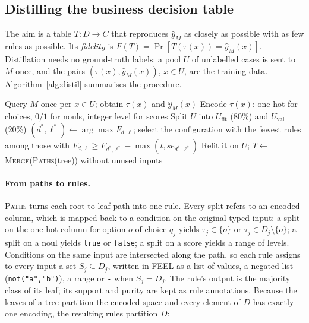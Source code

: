 \documentclass[a4paper,fleqn]{cas-sc}
\theoremstyle{definition}
\newcommand{\feel}[1]{\texttt{#1}}
\begin{document}
\subsection{Distilling the business decision table}\label{sec:distil}
The aim is a table $T: D\to C$ that reproduces $\hat y_M$ as closely as possible with as few rules as possible. Its \emph{fidelity} is $F(T)=\Pr[T(\tau(x))=\hat y_M(x)]$. Distillation needs no ground-truth labels: a pool $U$ of unlabelled cases is sent to $M$ once, and the pairs $(\tau(x),\hat y_M(x))$, $x\in U$, are the training data. Algorithm~\ref{alg:distil} summarises the procedure.

\begin{algorithm}[tbp]
  \caption{Distillation of a DMN decision table from a System One model.}
  \label{alg:distil}
  \small
  Query $M$ once per $x\in U$; obtain $\tau(x)$ and $\hat y_M(x)$\;
  Encode $\tau(x)$: one-hot for choices, $0/1$ for nouls, integer level for scores\;
  Split $U$ into $U_{\mathrm{fit}}$ (80\%) and $U_{\mathrm{val}}$ (20\%)\;
  $(d^*,\ell^*)\leftarrow\arg\max F_{d,\ell}$; select the configuration with the fewest rules among those with $F_{d,\ell}\ge F_{d^*,\ell^*}-\max(t,\mathit{se}_{d^*,\ell^*})$\;
  Refit it on $U$; \Return $T\leftarrow$ \textsc{Merge}(\textsc{Paths}(tree)) without unused inputs\;
\end{algorithm}

\paragraph{From paths to rules.} \textsc{Paths} turns each root-to-leaf path into one rule. Every split refers to an encoded column, which is mapped back to a condition on the original typed input: a split on the one-hot column for option $o$ of choice $q_j$ yields $\tau_j\in\{o\}$ or $\tau_j\in D_j\setminus\{o\}$; a split on a noul yields \feel{true} or \feel{false}; a split on a score yields a range of levels. Conditions on the same input are intersected along the path, so each rule assigns to every input a set $S_j\subseteq D_j$, written in FEEL as a list of values, a negated list (\feel{not("a","b")}), a range or \feel{-} when $S_j=D_j$. The rule's output is the majority class of its leaf; its support and purity are kept as rule annotations. Because the leaves of a tree partition the encoded space and every element of $D$ has exactly one encoding, the resulting rules partition $D$:
\end{document}
